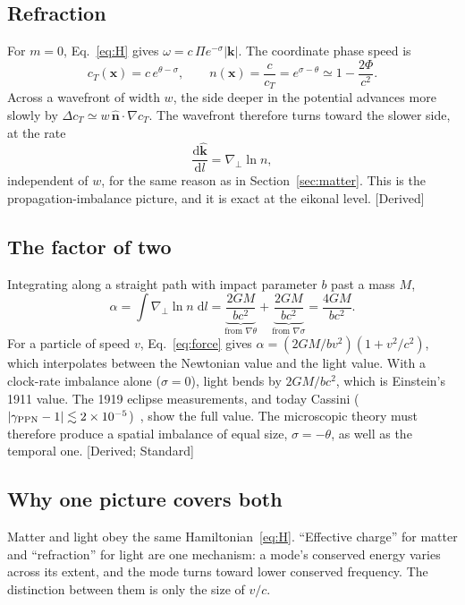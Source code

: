 \documentclass[11pt]{article}
\newcommand{\Pg}{\Pi}
\newcommand{\thP}{\theta}
\newcommand{\sgP}{\sigma}
\newcommand{\dd}{\mathrm{d}}
\newcommand{\st}[1]{\textsf{\small[#1]}}
\theoremstyle{plain}
\theoremstyle{remark}
\begin{document}
\subsection{Refraction}

For $m=0$, Eq.~\eqref{eq:H} gives $\omega=c\,\Pg e^{-\sgP}|\mathbf k|$. The coordinate phase speed is
\begin{equation}
c_T(\mathbf x)=c\,e^{\thP-\sgP},\qquad n(\mathbf x)=\frac{c}{c_T}=e^{\sgP-\thP}\simeq1-\frac{2\Phi}{c^2}.
\label{eq:index}
\end{equation}
Across a wavefront of width $w$, the side deeper in the potential advances more slowly by $\Delta c_T\simeq w\,\hat{\mathbf n}\cdot\nabla c_T$. The wavefront therefore turns toward the slower side, at the rate
\begin{equation}
\frac{\dd\hat{\mathbf k}}{\dd l}=\nabla_\perp\ln n ,
\end{equation}
independent of $w$, for the same reason as in Section~\ref{sec:matter}. This is the propagation-imbalance picture, and it is exact at the eikonal level. \st{Derived}

\subsection{The factor of two}

Integrating along a straight path with impact parameter $b$ past a mass $M$,
\begin{equation}
\alpha=\int\nabla_\perp\ln n\;\dd l
=\underbrace{\frac{2GM}{bc^2}}_{\text{from }\nabla\thP}
+\underbrace{\frac{2GM}{bc^2}}_{\text{from }\nabla\sgP}
=\frac{4GM}{bc^2}.
\end{equation}
For a particle of speed $v$, Eq.~\eqref{eq:force} gives $\alpha=(2GM/bv^2)(1+v^2/c^2)$, which interpolates between the Newtonian value and the light value. With a clock-rate imbalance alone ($\sgP=0$), light bends by $2GM/bc^2$, which is Einstein's 1911 value. The 1919 eclipse measurements, and today Cassini ($|\gamma_{\rm PPN}-1|\lesssim2\times10^{-5}$)~\cite{Bertotti2003}, show the full value. The microscopic theory must therefore produce a spatial imbalance of equal size, $\sgP=-\thP$, as well as the temporal one. \st{Derived; Standard}

\subsection{Why one picture covers both}

Matter and light obey the same Hamiltonian~\eqref{eq:H}. ``Effective charge'' for matter and ``refraction'' for light are one mechanism: a mode's conserved energy varies across its extent, and the mode turns toward lower conserved frequency. The distinction between them is only the size of $v/c$.
\end{document}
